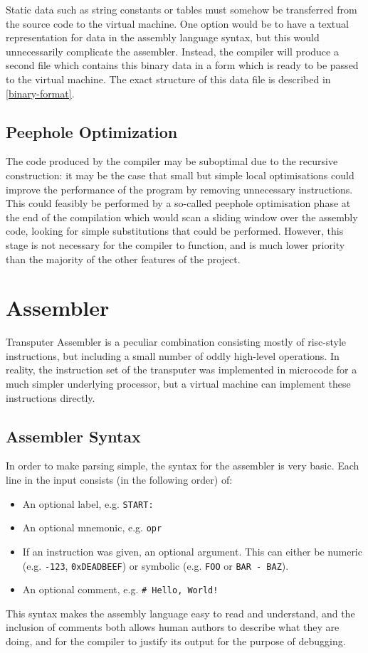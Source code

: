 Static data such as string constants or tables must somehow be transferred from
the source code to the virtual machine. One option would be to have a textual
representation for data in the assembly language syntax, but this would
unnecessarily complicate the assembler. Instead, the compiler will produce a
second file which contains this binary data in a form which is ready to be
passed to the virtual machine. The exact structure of this data file is
described in \ref{binary-format}.

\subsection{Peephole Optimization}

The code produced by the compiler may be suboptimal due to the recursive
construction: it may be the case that small but simple local optimisations could
improve the performance of the program by removing unnecessary instructions.
This could feasibly be performed by a so-called peephole optimisation phase at
the end of the compilation which would scan a sliding window over the assembly
code, looking for simple substitutions that could be performed. However, this
stage is not necessary for the compiler to function, and is much lower priority
than the majority of the other features of the project.

\section{Assembler}

Transputer Assembler is a peculiar combination consisting mostly of
\gls{risc}-style instructions, but including a small number of oddly high-level
operations. In reality, the instruction set of the transputer was implemented in
microcode for a much simpler underlying processor, but a virtual machine can
implement these instructions directly.

\subsection{Assembler Syntax} \label{asm-syntax}

In order to make parsing simple, the syntax for the assembler is very basic.
Each line in the input consists (in the following order) of:
\begin{itemize}
  \item An optional label, e.g. \texttt{START:}
  \item An optional \gls{mnemonic}, e.g. \texttt{opr}
  \item If an instruction was given, an optional argument. This can either be
        numeric (e.g. \texttt{-123}, \texttt{0xDEADBEEF}) or symbolic
        (e.g. \texttt{FOO} or \texttt{BAR - BAZ}).
  \item An optional comment, e.g. \texttt{\# Hello, World!}
\end{itemize}
This syntax makes the assembly language easy to read and understand, and the
inclusion of comments both allows human authors to describe what they are doing,
and for the compiler to justify its output for the purpose of debugging.


